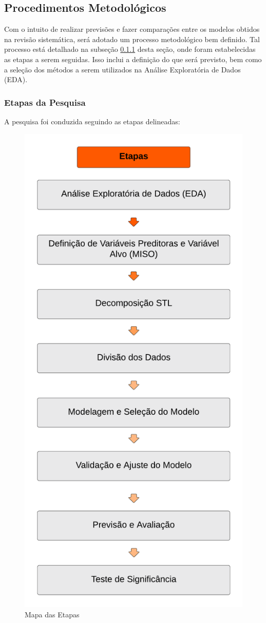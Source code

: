 

\subsection{Procedimentos Metodol{\'o}gicos} \label{subsec:metod}

Com o intuito de realizar previsões e fazer comparações entre os modelos obtidos na revisão sistemática, será adotado um processo metodológico bem definido. Tal processo está detalhado na subseção \ref{subsubsec:etp} desta seção, onde foram estabelecidas as etapas a serem seguidas. Isso inclui a definição do que será previsto, bem como a seleção dos métodos a serem utilizados na Análise Exploratória de Dados (EDA).
   

\subsubsection{Etapas da Pesquisa}\label{subsubsec:etp}

A pesquisa foi conduzida seguindo as etapas delineadas:

\begin{figure}[H]
	\centering
	\caption{Mapa das Etapas}
	\label{fig:etapas}
	\includegraphics[width=0.4\linewidth]{Introducao/Figuras/Etapas}
	
	
\end{figure}

